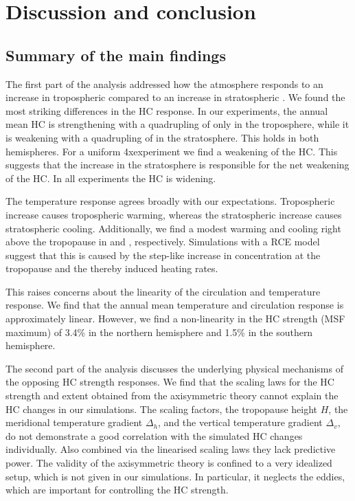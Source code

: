 \chapter{Discussion and conclusion}
\label{chapter:discussion}


\section{Summary of the main findings}
The first part of the analysis addressed how the atmosphere responds to an increase in tropospheric \CO compared to an increase in stratospheric \CO. We found the most striking differences in the HC response. In our experiments, the annual mean HC is strengthening with a quadrupling of \CO only in the troposphere, while it is weakening with a quadrupling of \CO in the stratosphere. This holds in both hemispheres. For a uniform 4x\CO experiment we find a weakening of the HC. This suggests that the \CO increase in the stratosphere is responsible for the net weakening of the HC. In all experiments the HC is widening.

The temperature response agrees broadly with our expectations. Tropospheric \CO increase causes tropospheric warming, whereas the stratospheric \CO increase causes stratospheric cooling. Additionally, we find a modest warming and cooling right above the tropopause in \strato and \tropo, respectively. Simulations with a RCE model suggest that this is caused by the step-like increase in \CO concentration at the tropopause and the thereby induced heating rates.

This raises concerns about the linearity of the circulation and temperature response. We find that the annual mean temperature and circulation response is approximately linear. However, we find a non-linearity in the HC strength (MSF maximum) of 3.4\% in the northern hemisphere and 1.5\% in the southern hemisphere.


The second part of the analysis discusses the underlying physical mechanisms of the opposing HC strength responses. We find that the scaling laws for the HC strength and extent obtained from the axisymmetric theory cannot explain the HC changes in our simulations. The scaling factors, the tropopause height $H$, the meridional temperature gradient $\Delta_h$, and the vertical temperature gradient $\Delta_v$, do not demonstrate a good correlation with the simulated HC changes individually. Also combined via the linearised scaling laws they lack predictive power. The validity of the axisymmetric theory is confined to a very idealized setup, which is not given in our simulations. In particular, it neglects the eddies, which are important for controlling the HC strength.

